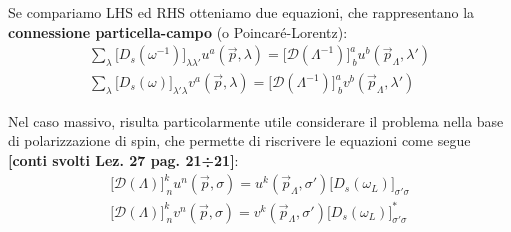 \documentclass[../main.tex]{subfiles}
\begin{document}
Se compariamo LHS ed RHS otteniamo due equazioni, che rappresentano la \textbf{connessione particella-campo} (o Poincaré-Lorentz):
\begin{equation}
    \boxed{
    \begin{aligned}
        \sum_\lambda \big[D_s(\omega^{-1})\big]_{\lambda\lambda'} u^a(\Vec{p},\lambda) = 
        \big[\mathscr D(\Lambda^{-1})\big]^a_{~b}u^b(\Vec{p}_\Lambda,\lambda')\\
        \sum_\lambda \big[D_s(\omega)\big]_{\lambda'\lambda} v^a(\Vec{p},\lambda) = \big[\mathscr D(\Lambda^{-1})\big]^a_{~b}v^b(\Vec{p}_\Lambda,\lambda')
    \end{aligned}}
    \label{eq:poinc_lorentz_conn}
\end{equation}
\begin{nota}
    Nel caso massivo, risulta particolarmente utile considerare il problema nella base di polarizzazione di spin, che permette di riscrivere le equazioni come segue \textbf{[conti svolti Lez. 27 pag. 21÷21]}:
    \begin{equation}
        \boxed{
        \begin{aligned}
            \big[\mathscr D(\Lambda)\big]^k_{~n}u^n(\Vec{p},\sigma)= u^k(\Vec{p}_\Lambda,\sigma')\big[D_s(\omega_L)\big]_{\sigma'\sigma}  \\
            \big[\mathscr D(\Lambda)\big]^k_{~n}v^n(\Vec{p},\sigma) = v^k(\Vec{p}_\Lambda,\sigma')\big[D_s(\omega_L)\big]^\ast_{\sigma'\sigma}  
        \end{aligned}}
        \label{eq:poinc_lorentz_conn_spinpol_basis}
    \end{equation}
\end{nota}
\end{document}
